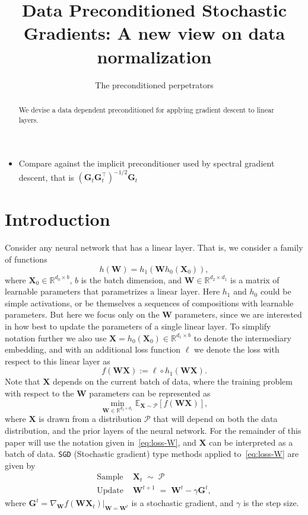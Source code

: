 \documentclass[11pt]{article}
\date{}
\title{Data Preconditioned Stochastic Gradients: A new view on data normalization}
\author{The preconditioned perpetrators } %
\newcommand{\mat}[1]{\bm{#1}}
\newcommand{\cP}{\mathcal{ P}}
\newcommand{\mG}{\mat{ G}}
\newcommand{\mX}{\mat{ X}}
\newcommand{\mW}{\mat{ W}}
\newcommand{\R}{\mathbb{R}}
\newcommand{\EE}[2]{\mathbb{E}_{#1}\left[#2\right] }
\newcommand{\rob}[1]{\todo[inline]{\textbf{Robert: }#1}}
\begin{document}
\maketitle

\tableofcontents

\begin{abstract}
We devise a data dependent preconditioned for applying gradient descent to linear layers.
\end{abstract}

\rob{TODO:}
\begin{itemize}
    \item Compare against the implicit preconditioner used by spectral gradient descent, that is $(\mG_t \mG_t^\top)^{-1/2} \mG_t$
\end{itemize}


\section{Introduction}
Consider any neural network that has a linear layer. That is,
we consider a family of functions
\[ h(\mW) =   h_1(\mW h_0(\mX_0)),\]
where $\mX_0 \in \R^{d_0 \times b}$, $b$ is the batch dimension, and $\mW \in \R^{ d_2 \times d_1}$ is a matrix of learnable parameters that parametrizes a linear layer. Here $h_1$ and $h_0$ could be simple activations, or be themselves a sequences of compositions with learnable parameters. But here we focus only on the $\mW$ parameters, since we are interested in  how best to update the parameters of a single linear layer.
To simplify notation  further we also use $\mX = h_0(\mX_0) \in \R^{d_1 \times b}$ to denote the intermediary embedding, and  with an additional loss function $\ell$ we denote the loss with respect to this linear layer as 
\begin{equation}
     f(\mW\mX) :=  \ell \circ  h_1(\mW \mX).
\end{equation}
Note that $\mX$ depends on the current batch of data, where the training problem with respect to the $\mW$ parameters can be represented as
\begin{equation}\label{eq:loss-W}
    \min_{\mW \in \R^{d_2 \times d_1}} \EE{\mX \sim \cP}{ f(\mW\mX)},
\end{equation}
where $\mX$ is drawn from a distribution $\cP$ that will depend on both the data distribution, and the prior layers of the neural network. For the remainder of this paper will use the notation given in~\eqref{eq:loss-W}, and $\mX$ can be interpreted as a batch of data.   \texttt{SGD} (Stochastic gradient) type methods applied to~\eqref{eq:loss-W} are given by
\begin{align}
    \mbox{Sample }& \mX_t \;\sim \; \cP \\
    \mbox{Update }&  \mW^{t+1} \;=\;  \mW^{t} - \gamma \mG^t, 
\end{align}
where $\mG^t = \left.\nabla_{\mW} f(\mW\mX_t)\right|_{\mW=\mW^t}$ is a stochastic gradient, and $\gamma$ is the step size.
\end{document}
